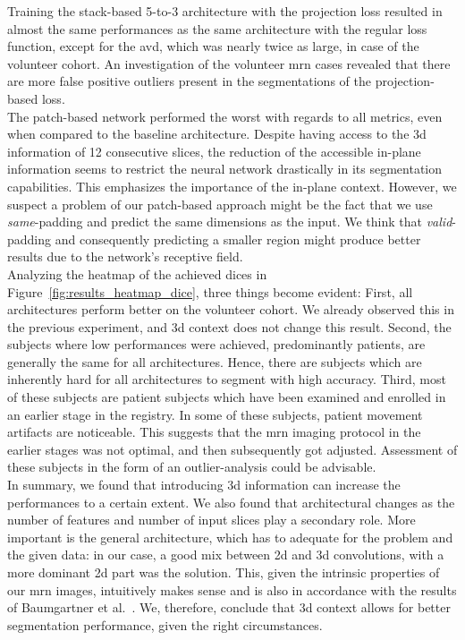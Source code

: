 Training the stack-based 5-to-3 architecture with the projection loss resulted in almost the same performances as the same architecture with the regular loss function, except for the \acrlong{avd}, which was nearly twice as large, in case of the volunteer cohort. An investigation of the volunteer \gls{mrn} cases revealed that there are more false positive outliers present in the segmentations of the projection-based loss.\\
The patch-based network performed the worst with regards to all metrics, even when compared to the baseline architecture. Despite having access to the \gls{3d} information of 12 consecutive slices, the reduction of the accessible in-plane information seems to restrict the neural network drastically in its segmentation capabilities. This emphasizes the importance of the in-plane context. However, we suspect a problem of our patch-based approach might be the fact that we use \textit{same}-padding and predict the same dimensions as the input. We think that \textit{valid}-padding and consequently predicting a smaller region might produce better results due to the network's receptive field.\\
Analyzing the heatmap of the achieved \gls{dice}s in Figure~\ref{fig:results_heatmap_dice}, three things become evident: First, all architectures perform better on the volunteer cohort. We already observed this in the previous experiment, and \gls{3d} context does not change this result. Second, the subjects where low performances were achieved, predominantly patients, are generally the same for all architectures. Hence, there are subjects which are inherently hard for all architectures to segment with high accuracy. Third, most of these subjects are patient subjects which have been examined and enrolled in an earlier stage in the registry. In some of these subjects, patient movement artifacts are noticeable. This suggests that the \gls{mrn} imaging protocol in the earlier stages was not optimal, and then subsequently got adjusted. Assessment of these subjects in the form of an outlier-analysis could be advisable.\\
In summary, we found that introducing \gls{3d} information can increase the performances to a certain extent. We also found that architectural changes as the number of features and number of input slices play a secondary role. More important is the general architecture, which has to adequate for the problem and the given data: in our case, a good mix between \gls{2d} and \gls{3d} convolutions, with a more dominant \gls{2d} part was the solution. This, given the intrinsic properties of our \gls{mrn} images, intuitively makes sense and is also in accordance with the results of Baumgartner et al.~\cite{Baumgartner2017AnSegmentation}. We, therefore, conclude that \gls{3d} context allows for better segmentation performance, given the right circumstances.

